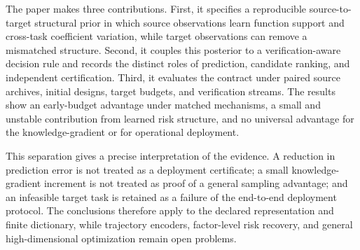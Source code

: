 The paper makes three contributions. First, it specifies a reproducible
source-to-target structural prior in which source observations learn function
support and cross-task coefficient variation, while target observations can
remove a mismatched structure. Second, it couples this posterior to a
verification-aware decision rule and records the distinct roles of prediction,
candidate ranking, and independent certification. Third, it evaluates the
contract under paired source archives, initial designs, target budgets, and
verification streams. The results show an early-budget advantage under
matched mechanisms, a small and unstable contribution from learned risk
structure, and no universal advantage for the knowledge-gradient or for
operational deployment.

This separation gives a precise interpretation of the evidence. A reduction
in prediction error is not treated as a deployment certificate; a small
knowledge-gradient increment is not treated as proof of a general sampling
advantage; and an infeasible target task is retained as a failure of the
end-to-end deployment protocol. The conclusions therefore apply to the
declared representation and finite dictionary, while trajectory encoders,
factor-level risk recovery, and general high-dimensional optimization remain
open problems.
